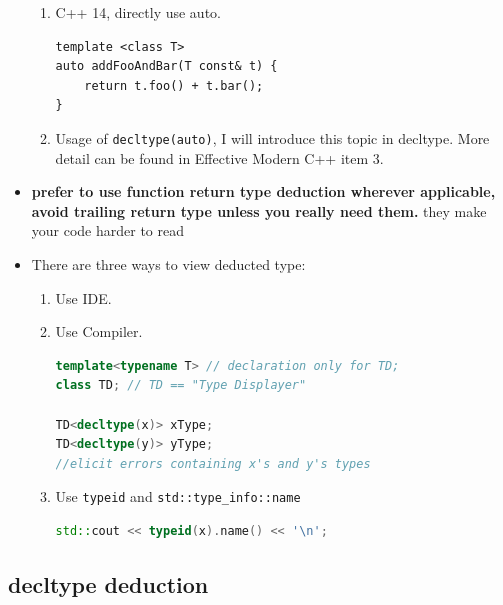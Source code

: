\documentclass[a4paper,11pt,twoside]{book}
\begin{document}
\begin{itemize}
\begin{enumerate}
\item C++ 14, directly use auto.
\begin{lstlisting}[numbers=none]
template <class T>
auto addFooAndBar(T const& t) {
    return t.foo() + t.bar();
}
\end{lstlisting}

		\item Usage of \texttt{decltype(auto)}, I will introduce this topic in decltype. More detail can be found in Effective Modern C++ item 3.
	\end{enumerate}
	
	\item \textbf{prefer to use function return type deduction wherever applicable, avoid trailing return type unless you really need them.} they make your code harder to read
	
	\item There are three ways to view deducted type:
\begin{enumerate}
	\item Use IDE.
	\item Use Compiler.
\begin{lstlisting}[frame=single, language=c++]
template<typename T> // declaration only for TD;
class TD; // TD == "Type Displayer"

TD<decltype(x)> xType; 
TD<decltype(y)> yType; 
//elicit errors containing x's and y's types
\end{lstlisting}
	
	\item Use \texttt{typeid} and \texttt{std::type\_info::name}
	
\begin{lstlisting}[frame=single, language=c++]
std::cout << typeid(x).name() << '\n'; 
\end{lstlisting}
	
\end{enumerate}

\end{itemize}



\subsection{decltype deduction}
\end{document}
